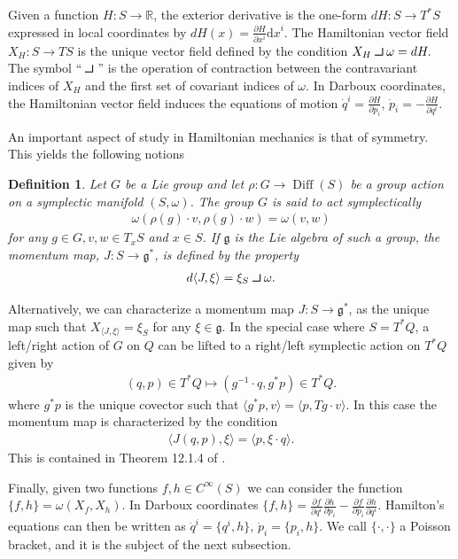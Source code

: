 \documentclass[12pt]{amsart}
\newcommand{\pder}[2]{\ensuremath{\frac{\partial #1}{\partial #2}}}
\newcommand{\dx}{\ensuremath{\textrm{d}x}}
\def\contract{\makebox[1.2em][c]{\mbox{\rule{.6em}
{.01truein}\rule{.01truein}{.6em}}}}
\newtheorem{defn}[thm]{Definition}
\DeclareMathOperator{\Diff}{Diff}
\begin{document}
Given a function $H:S \to \mathbb{R}$,
the exterior derivative is the one-form $dH:S \to T^*S$
expressed in local coordinates by $dH(x) = \pder{H}{x^i} \dx^i$.
The Hamiltonian vector field $X_H:S \to TS$ is the unique vector
field defined by the condition
$
  X_H \contract \omega = dH.
$
The symbol ``$\contract$'' is the operation of contraction between
the contravariant indices of $X_H$ and the first set of covariant
indices of $\omega$.
In Darboux coordinates, the Hamiltonian vector field induces the
equations of motion $\dot{q}^i = \pder{H}{p_i}$, $\dot{p}_i = -\pder{H}{q^i}$.


An important aspect of study in Hamiltonian mechanics is that of symmetry.
This yields the following notions

\begin{defn}
  Let $G$ be a Lie group and let $\rho:G \to \Diff(S)$ be a group action on a symplectic manifold $(S,\omega)$.
  The group $G$ is said to \emph{act symplectically}
  \begin{align*}
    \omega( \rho( g ) \cdot v , \rho(g) \cdot w) = \omega(v,w)
  \end{align*}
  for any $g \in G, v,w \in T_xS$ and $x \in S$.
  If $\mathfrak{g}$ is the Lie algebra of such a group,
  the \emph{momentum map}, $J:S \to \mathfrak{g}^*$,
  is defined by the property
  \begin{align*}
    d \langle J , \xi \rangle = \xi_S \contract \omega.
  \end{align*}
\end{defn}

Alternatively, we can characterize a momentum map $J: S \to \mathfrak{g}^*$, as the unique map such that $X_{\langle J , \xi \rangle} = \xi_S$ for any $\xi \in \mathfrak{g}$.
In the special case where $S = T^*Q$, a left/right action of $G$ on $Q$ can be lifted to a right/left symplectic action on $T^*Q$ given by
\begin{align*}
  (q,p) \in T^*Q \mapsto (g^{-1} \cdot q , g^* p) \in T^*Q.
\end{align*}
where $g^*p$ is the unique covector such that $\langle g^*p , v \rangle = \langle p , Tg \cdot v \rangle$.
In this case the momentum map is characterized by the condition
\begin{align}
  \langle J(q,p) , \xi \rangle = \langle p , \xi \cdot q \rangle.
  \label{eq:cotangent_momap}
\end{align}
This is contained in Theorem 12.1.4 of \cite{MandS}.

Finally, given two functions $f,h \in C^{\infty}(S)$ we can consider the function $\{ f,h\} = \omega( X_f, X_h)$.
In Darboux coordinates $\{ f , h \} = \pder{f}{q^i} \pder{h}{p_i} - \pder{f}{p_i} \pder{h}{q^i}$.
Hamilton's equations can then be written as $\dot{q}^i = \{ q^i , h \}$,
$\dot{p}_i = \{ p_i , h \}$.
We call $\{ \cdot , \cdot \}$ a Poisson bracket, and it is the subject of
the next subsection.
\end{document}
